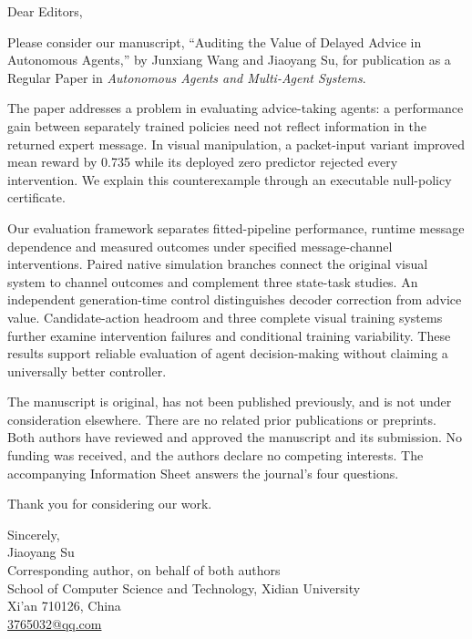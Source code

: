 \documentclass[11pt,a4paper]{article}
\begin{document}
Dear Editors,

Please consider our manuscript, ``Auditing the Value of Delayed Advice in Autonomous Agents,'' by Junxiang Wang and Jiaoyang Su, for publication as a Regular Paper in \emph{Autonomous Agents and Multi-Agent Systems}.

The paper addresses a problem in evaluating advice-taking agents: a performance gain between separately trained policies need not reflect information in the returned expert message. In visual manipulation, a packet-input variant improved mean reward by 0.735 while its deployed zero predictor rejected every intervention. We explain this counterexample through an executable null-policy certificate.

Our evaluation framework separates fitted-pipeline performance, runtime message dependence and measured outcomes under specified message-channel interventions. Paired native simulation branches connect the original visual system to channel outcomes and complement three state-task studies. An independent generation-time control distinguishes decoder correction from advice value. Candidate-action headroom and three complete visual training systems further examine intervention failures and conditional training variability. These results support reliable evaluation of agent decision-making without claiming a universally better controller.

The manuscript is original, has not been published previously, and is not under consideration elsewhere. There are no related prior publications or preprints. Both authors have reviewed and approved the manuscript and its submission. No funding was received, and the authors declare no competing interests. The accompanying Information Sheet answers the journal's four questions.

Thank you for considering our work.

Sincerely,\\
Jiaoyang Su\\
Corresponding author, on behalf of both authors\\
School of Computer Science and Technology, Xidian University\\
Xi'an 710126, China\\
\href{mailto:3765032@qq.com}{3765032@qq.com}
\end{document}
